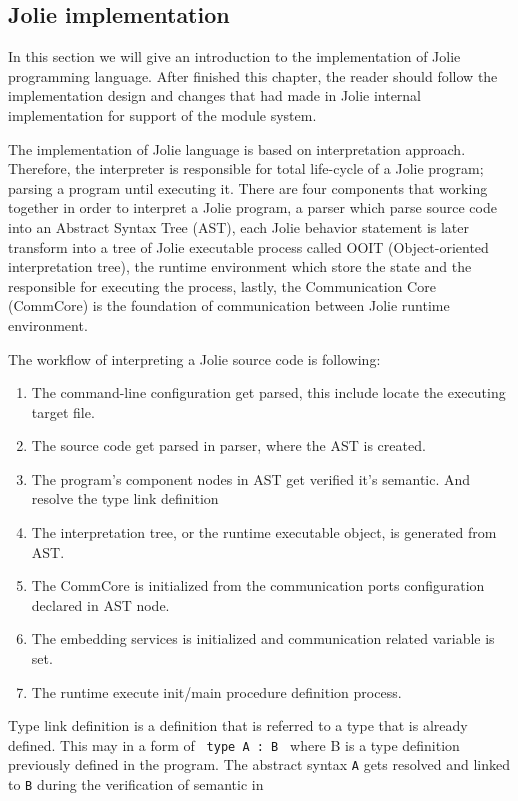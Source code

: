 \subsection{Jolie implementation}

In this section we will give an introduction to the implementation of Jolie programming language. After finished this chapter, the reader should follow the implementation design and changes that had made in Jolie internal implementation for support of the module system.

The implementation of Jolie language is based on interpretation approach. Therefore, the interpreter is responsible for total life-cycle of a Jolie program; parsing a program until executing it. There are four components that working together in order to interpret a Jolie program, a parser which parse source code into an Abstract Syntax Tree (AST), each Jolie behavior statement is later transform into a tree of Jolie executable process called OOIT (Object-oriented interpretation tree), the runtime environment which store the state and the responsible for executing the process, lastly, the Communication Core (CommCore) is the foundation of communication between Jolie runtime environment.

The workflow of interpreting a Jolie source code is following:

\begin{enumerate}
    \item The command-line configuration get parsed, this include locate the executing target file.
    \item The source code get parsed in parser, where the AST is created.
    \item The program's component nodes in AST get verified it's semantic. And resolve the type link definition
    \item The interpretation tree, or the runtime executable object, is generated from AST.
    \item The CommCore is initialized from the communication ports configuration declared in AST node.
    \item The embedding services is initialized and communication related variable is set.
    \item The runtime execute init/main procedure definition process.
\end{enumerate}

Type link definition is a definition that is referred to a type that is already defined. This may in a form of \lstinline{ type A : B } where B is a type definition previously defined in the program. The abstract syntax \texttt{A} gets resolved and linked to \texttt{B} during the verification of semantic in  

\FloatBarrier


